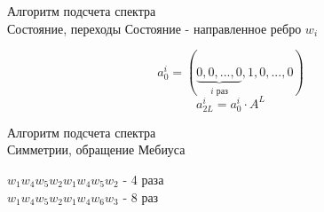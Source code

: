 \documentclass[t,13pt,graphics=pdflatex,xcolor=table,aspectratio=43]{beamer}
\begin{document}
\begin{frame}{Алгоритм подсчета спектра \\ Состояние, переходы}
  Состояние - направленное ребро $w_i$\\
  \begin{minipage}{0.35\textwidth}
    \centering
    \scalebox{0.7}{}
  \end{minipage}
  \begin{minipage}{0.60\textwidth}
  \end{minipage}
\[
a_0^i=(\underbrace{0,0,...,0}_{i \text{ раз}},1,0,...,0)
\]
\[
a_{2L}^i=a_0^i \cdot A^L
\]
\end{frame}

\begin{frame}{Алгоритм подсчета спектра \\ Симметрии, обращение Мебиуса}
  \begin{minipage}{0.45\textwidth}
    \centering
    
  \end{minipage}\hfill
  \begin{minipage}{0.45\textwidth}
    $w_1w_4w_5w_2w_1w_4w_5w_2$ - 4 раза \\
    $w_1w_4w_5w_2w_1w_4w_6w_3$ - 8 раз
  \end{minipage}
\end{frame}
\end{document}
